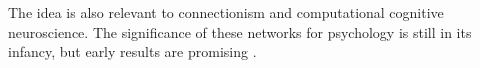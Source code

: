 
The idea is also relevant to connectionism and computational cognitive neuroscience. The significance of these networks for psychology is still in its infancy, but early results are promising \cite{zorzi2013modeling, ritter2017cognitive}.
